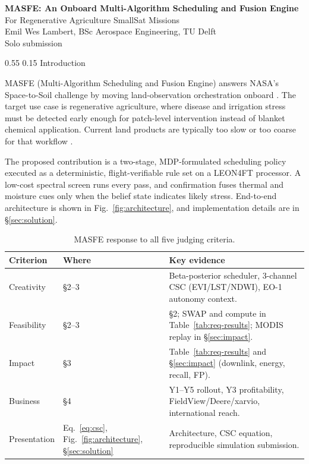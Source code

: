 \documentclass[11pt,letterpaper]{article}
\makeatletter
\renewcommand\section{\@startsection{section}{1}{\z@}
  {0.55\baselineskip}
  {0.15\baselineskip}
  {\normalfont\large\bfseries}}
\renewcommand{\arraystretch}{1.15}
\makeatother
\begin{document}
\thispagestyle{fancy}

\begin{center}
{\LARGE\bfseries MASFE: An Onboard Multi-Algorithm Scheduling and Fusion Engine}\\[2pt]
{\large For Regenerative Agriculture SmallSat Missions}\\[3pt]
Emil Wes Lambert, BSc Aerospace Engineering, TU Delft\\
Solo submission
\end{center}

\section{Introduction}

MASFE (Multi-Algorithm Scheduling and Fusion Engine) answers NASA's Space-to-Soil challenge by moving land-observation orchestration onboard \cite{nasa-challenge-brief}. The target use case is regenerative agriculture, where disease and irrigation stress must be detected early enough for patch-level intervention instead of blanket chemical application. Current land products are typically too slow or too coarse for that workflow \cite{gold-webinar1,mod13a1,mod11a1}.

The proposed contribution is a two-stage, MDP-formulated scheduling policy executed as a deterministic, flight-verifiable rule set on a LEON4FT processor. A low-cost spectral screen runs every pass, and confirmation fuses thermal and moisture cues only when the belief state indicates likely stress. End-to-end architecture is shown in Fig.~\ref{fig:architecture}, and implementation details are in \S\ref{sec:solution}.

\begin{table}[H]
\centering
\caption{MASFE response to all five judging criteria.}
\label{tab:criteria-summary}
\begingroup
\small
\setlength{\tabcolsep}{5pt}
\renewcommand{\arraystretch}{1.1}
\begin{tabularx}{\linewidth}{p{2.2cm}p{3cm}X}
\toprule
\textbf{Criterion} & \textbf{Where} & \textbf{Key evidence} \\
\midrule
Creativity & \S2--3 & Beta-posterior scheduler, 3-channel CSC (EVI/LST/NDWI), EO-1 autonomy context. \\
Feasibility & \S2--3 & \S2; SWAP and compute in Table~\ref{tab:req-results}; MODIS replay in \S\ref{sec:impact}. \\
Impact & \S3 & Table~\ref{tab:req-results} and \S\ref{sec:impact} (downlink, energy, recall, FP). \\
Business & \S4 & Y1--Y5 rollout, Y3 profitability, FieldView/Deere/xarvio, international reach. \\
Presentation & Eq.~\eqref{eq:csc}, Fig.~\ref{fig:architecture}, \S\ref{sec:solution} & Architecture, CSC equation, reproducible simulation submission. \\
\bottomrule
\end{tabularx}
\endgroup
\end{table}
\end{document}
